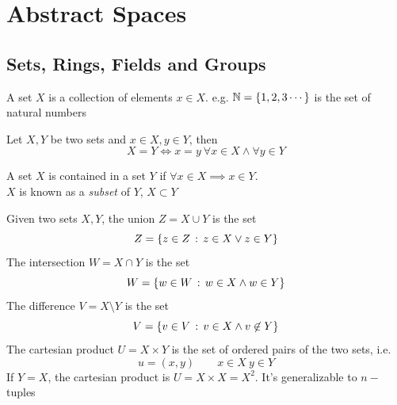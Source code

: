 \documentclass[../complete.tex]{subfiles}
\begin{document}
\chapter{Abstract Spaces}
\section{Sets, Rings, Fields and Groups}
\begin{dfn}[Set]
	A set $X$ is a collection of elements $x\in X$. e.g. $\mathbb{N}=\left\{ 1, 2, 3\cdots \right\}$ is the set of natural numbers
\end{dfn}
\begin{thm}
	Let $X, Y$ be two sets and $x\in X, y\in Y$, then
	\begin{equation*}
		X=Y\iff{}x=y\ \forall x\in X\wedge\forall y\in Y
	\end{equation*}
\end{thm}
\begin{dfn}[Subset]
	A set $X$ is contained in a set $Y$ if $\forall x\in X\implies{}x\in Y$.\\
	$X$ is known as a \textit{subset} of $Y$, $X\subset Y$
\end{dfn}
\begin{dfn}
	Given two sets $X, Y$, the union $Z=X\cup Y$ is the set
	\begin{equation*}
		Z=\left\{ z\in Z\, :\,  z\in X\vee z\in Y \right\}
	\end{equation*}
	The intersection $W=X\cap Y$ is the set
	\begin{equation*}
		W=\left\{ w\in W\, :\,  w\in X\wedge w\in Y \right\}
	\end{equation*}
	The difference $V=X\setminus Y$ is the set
	\begin{equation*}
		V=\left\{ v\in V\, :\,  v\in X\wedge v\not\in Y \right\}
	\end{equation*}
	The cartesian product $U=X\times Y$ is the set of ordered pairs of the two sets, i.e.
	\begin{equation*}
		u=(x, y)\qquad x\in X\ y\in Y
	\end{equation*}
	If $Y=X$, the cartesian product is $U=X\times X=X^2$. It's generalizable to $n-$tuples
\end{dfn}
\end{document}
